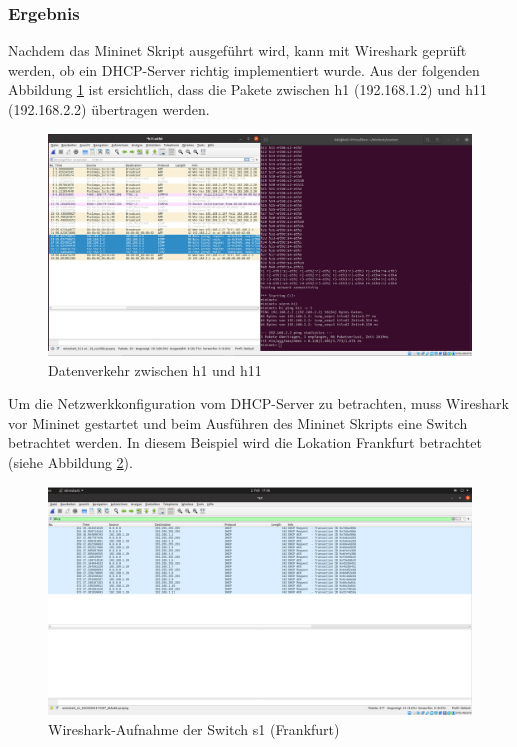 \documentclass[fontsize=12pt,paper=a4,open=any,parskip=half,
  twoside=false,toc=listof,toc=bibliography,fleqn,leqno,
  captions=nooneline,captions=tableabove,british]{scrbook}
\begin{document}
\subsubsection{Ergebnis}
Nachdem das Mininet Skript ausgeführt wird, kann mit Wireshark geprüft werden, ob ein DHCP-Server richtig implementiert wurde. Aus der folgenden Abbildung \ref{wireshark} ist ersichtlich, dass die Pakete zwischen h1 (192.168.1.2) und h11 (192.168.2.2) übertragen werden.
\begin{figure}[H]
 \centering
 \includegraphics[width=1.0\textwidth]{Bilder/wireshark}
 \captionsetup{justification=centering}
 \caption{Datenverkehr zwischen h1 und h11}
 \label{wireshark}
\end{figure}

Um die Netzwerkkonfiguration vom DHCP-Server zu betrachten, muss Wireshark vor Mininet gestartet und beim Ausführen des Mininet Skripts eine Switch betrachtet werden. In diesem Beispiel wird die Lokation Frankfurt betrachtet (siehe Abbildung \ref{s1}).

\begin{figure}[H]
 \centering
 \includegraphics[width=1.0\textwidth]{Bilder/s1}
 \captionsetup{justification=centering}
 \caption{Wireshark-Aufnahme der Switch s1 (Frankfurt)}
 \label{s1}
\end{figure}
\end{document}
